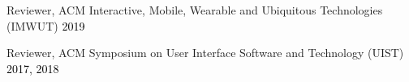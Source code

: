 Reviewer, ACM Interactive, Mobile, Wearable and Ubiquitous Technologies (IMWUT) \hfill \textcolor{black}{2019}

Reviewer, ACM Symposium on User Interface Software and Technology (UIST) \hfill \textcolor{black}{2017, 2018}\\










\pagebreak

%







%
%
%
%
%
%

